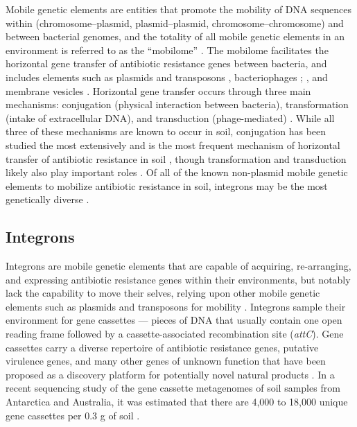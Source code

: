 Mobile genetic elements are entities that promote the mobility of DNA sequences within (chromosome–plasmid, plasmid–plasmid, chromosome–chromosome) and between bacterial genomes, and the totality of all mobile genetic elements in an environment is referred to as the “mobilome” \parencite{Partridge.2018, Perry.2013}.
The mobilome facilitates the horizontal gene transfer of antibiotic resistance genes between bacteria, and includes elements such as plasmids and transposons \parencite{Partridge.2018}, bacteriophages \parencite{Subirats.2016}; \parencite{ColomerLluch.2011}, and membrane vesicles \parencite{Chattopadhyay.2015}.
Horizontal gene transfer occurs through three main mechanisms: conjugation (physical interaction between bacteria), transformation (intake of extracellular DNA), and transduction (phage-mediated) \parencite{Partridge.2018}.
While all three of these mechanisms are known to occur in soil, conjugation has been studied the most extensively and is the most frequent mechanism of horizontal transfer of antibiotic resistance in soil \parencite{Perry.2013}, though transformation and transduction likely also play important roles \parencite{Perry.2013, Aminov.2011}.
Of all of the known non-plasmid mobile genetic elements to mobilize antibiotic resistance in soil, integrons may be the most genetically diverse \parencite{Ghaly.2019}.

\subsection{Integrons}

Integrons are mobile genetic elements that are capable of acquiring, re-arranging, and expressing antibiotic resistance genes within their environments, but notably lack the capability to move their selves, relying upon other mobile genetic elements such as plasmids and transposons for mobility \parencite{Gillings.2014}.
Integrons sample their environment for gene cassettes \parencite{Ghaly.2020} --- pieces of DNA that usually contain one open reading frame followed by a cassette-associated recombination site (\textit{attC}).
Gene cassettes carry a diverse repertoire of antibiotic resistance genes, putative virulence genes, and many other genes of unknown function that have been proposed as a discovery platform for potentially novel natural products \parencite{Ma.2017, Ghaly.2019, Ghaly.2020}.
In a recent sequencing study of the gene cassette metagenomes of soil samples from Antarctica and Australia, it was estimated that there are 4,000 to 18,000 unique gene cassettes per 0.3 g of soil \parencite{Ghaly.2019}.

